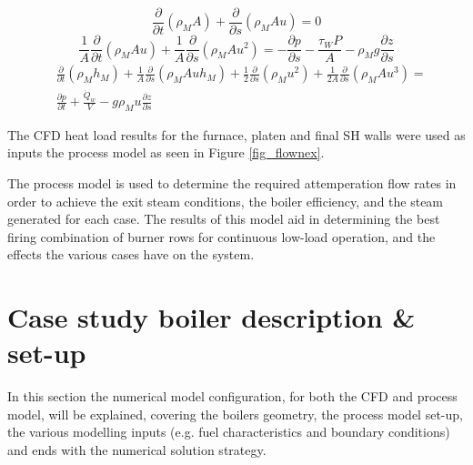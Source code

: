 \documentclass[review]{elsarticle}
\begin{document}
\begin{equation}\label{eqn_mix_conti}
\frac{\partial}{\partial t}(\rho_M A)+\frac{\partial}{\partial s}(\rho_MAu) = 0
\end{equation}
\begin{equation}\label{eqn_mix_mom}
\frac{1}{A} \frac{\partial}{\partial t}(\rho_M A u)+\frac{1}{A} \frac{\partial}{\partial s}(\rho_M A u^2) = -\frac{\partial p}{\partial s}-\frac{\tau_W P}{A}- \rho_M g \frac{\partial z}{\partial s}
\end{equation}
\begin{equation}\label{eqn_mix_energy}
\begin{split}
&\frac{\partial}{\partial t}(\rho_Mh_M)+\frac{1}{A}\frac{\partial}{\partial s}(\rho_MAuh_M)+\frac{1}{2}\frac{\partial}{\partial s}(\rho_Mu^2)+\frac{1}{2A}\frac{\partial}{\partial s}(\rho_MAu^3)=\\&\frac{\partial p}{\partial t} + \frac{\dot{Q}_w}{V}-g\rho_Mu\frac{\partial z}{\partial s}
\end{split}
\end{equation}

The CFD heat load results for the furnace, platen and final SH walls were used as inputs the process model as seen in Figure \ref{fig_flownex}. 

The process model is used to determine the required attemperation flow rates in order to achieve the exit steam conditions, the boiler efficiency, and the steam generated for each case. The results of this model aid in determining the best firing combination of burner rows for continuous low-load operation, and the effects the various cases have on the system.

\section{Case study boiler description \& set-up}
In this section the numerical model configuration, for both the CFD and process model, will be explained, covering the boilers geometry, the process model set-up, the various  modelling inputs (e.g. fuel characteristics and boundary conditions) and ends with the numerical solution strategy.
\newpage
\end{document}

